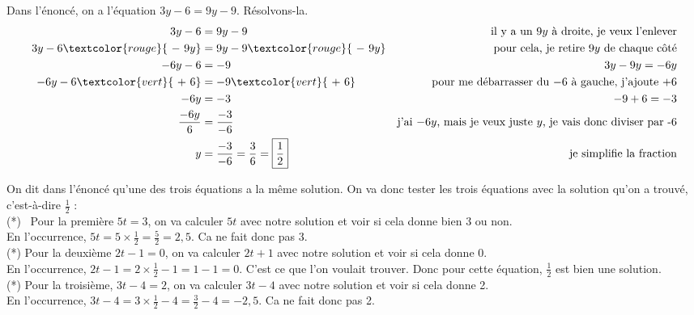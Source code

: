 \documentclass["../Cours.tex"]{subfiles}
\begin{document}
\begin{questions}
    \clearpage
    \exercice Dans l'énoncé, on a l'équation $3y-6=9y-9$. Résolvons-la.
    \begin{align*}
        3y-6 &= 9y-9  & \mbox{il y a un $9y$ à droite, je veux l'enlever}\\
        3y-6\textcolor{rouge}{~-~9y} &= 9y-9\textcolor{rouge}{~-~9y} & \mbox{pour cela, je retire $9y$ de chaque côté}\\
        -6y-6 &= -9  & 3y-9y=-6y\\
        -6y-6\textcolor{vert}{~+~6} &= -9\textcolor{vert}{~+~6} & \mbox{pour me débarrasser du $-6$ à gauche, j'ajoute $+6$}\\
        -6y &= -3 & -9+6=-3 \\
        \dfrac{-6y}{6} &= \dfrac{-3}{-6} & \mbox{j'ai $-6y$, mais je veux juste $y$, je vais donc diviser par -6} \\
        y &= \dfrac{-3}{-6} = \dfrac{3}{6} = \fbox{$\dfrac{1}{2}$} & \mbox{je simplifie la fraction}
    \end{align*}

    On dit dans l'énoncé qu'une des trois équations a la même solution. On va donc tester les trois équations avec la solution qu'on a trouvé, c'est-à-dire $\frac{1}{2}$ :\\

    (*)~ Pour la première $5t=3$, on va calculer $5t$ avec notre solution et voir si cela donne bien 3 ou non.\\
    En l'occurrence, $5t = 5\times \frac{1}{2} = \frac{5}{2} = 2{,}5$. Ca ne fait donc pas 3.\\

    (*) Pour la deuxième $2t-1=0$, on va calculer $2t+1$ avec notre solution et voir si cela donne 0.\\
    En l'occurrence, $2t-1 = 2 \times \frac{1}{2} - 1 = 1 - 1 = 0$. C'est ce que l'on voulait trouver. Donc pour cette équation, $\frac{1}{2}$ est bien une solution.\\

    (*) Pour la troisième, $3t-4=2$, on va calculer $3t-4$ avec notre solution et voir si cela donne 2.\\
    En l'occurrence, $3t-4 = 3 \times \frac{1}{2} - 4 = \frac{3}{2} - 4 = -2{,}5$. Ca ne fait donc pas 2.
\end{questions}
\end{document}

